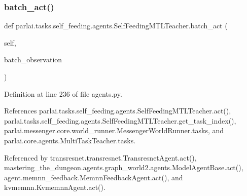 \subsubsection{\texorpdfstring{batch\+\_\+act()}{batch\_act()}}
{\footnotesize\ttfamily def parlai.\+tasks.\+self\+\_\+feeding.\+agents.\+Self\+Feeding\+M\+T\+L\+Teacher.\+batch\+\_\+act (\begin{DoxyParamCaption}\item[{}]{self,  }\item[{}]{batch\+\_\+observation }\end{DoxyParamCaption})}



Definition at line 236 of file agents.\+py.



References parlai.\+tasks.\+self\+\_\+feeding.\+agents.\+Self\+Feeding\+M\+T\+L\+Teacher.\+act(), parlai.\+tasks.\+self\+\_\+feeding.\+agents.\+Self\+Feeding\+M\+T\+L\+Teacher.\+get\+\_\+task\+\_\+index(), parlai.\+messenger.\+core.\+world\+\_\+runner.\+Messenger\+World\+Runner.\+tasks, and parlai.\+core.\+agents.\+Multi\+Task\+Teacher.\+tasks.



Referenced by transresnet.\+transresnet.\+Transresnet\+Agent.\+act(), mastering\+\_\+the\+\_\+dungeon.\+agents.\+graph\+\_\+world2.\+agents.\+Model\+Agent\+Base.\+act(), agent.\+memnn\+\_\+feedback.\+Memnn\+Feedback\+Agent.\+act(), and kvmemnn.\+Kvmemnn\+Agent.\+act().

